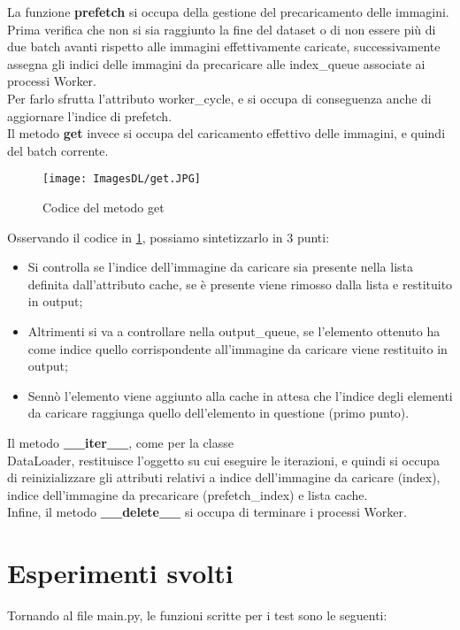 \documentclass[10pt,twocolumn,letterpaper]{article}
\newcommand{\bit} {\begin{itemize} }
\newcommand{\eit} {\end{itemize} }
\begin{document}
La funzione \textbf{prefetch} si occupa della gestione del precaricamento delle immagini. Prima verifica che non si sia raggiunto la fine del dataset o di non essere più di due batch avanti rispetto alle immagini effettivamente caricate, successivamente assegna gli indici delle immagini da precaricare alle index\_queue associate ai processi Worker.\\
Per farlo sfrutta l'attributo worker\_cycle, e si occupa di conseguenza anche di aggiornare l'indice di prefetch.\\
Il metodo \textbf{get} invece si occupa del caricamento effettivo delle immagini, e quindi del batch corrente.

\begin{figure}[h]
    \centering
    \texttt{[image: ImagesDL/get.JPG]}
    \caption{Codice del metodo get}
    \label{fig:get}
\end{figure}

Osservando il codice in \cref{fig:get}, possiamo sintetizzarlo in 3 punti:

\bit
    \item{Si controlla se l'indice dell'immagine da caricare sia presente nella lista definita dall'attributo cache, se è presente viene rimosso dalla lista e restituito in output;}
    \item{Altrimenti si va a controllare nella output\_queue, se l'elemento ottenuto ha come indice quello corrispondente all'immagine da caricare viene restituito in output;}
    \item{Sennò l'elemento viene aggiunto alla cache in attesa che l'indice degli elementi da caricare raggiunga quello dell'elemento in questione (primo punto).}
\eit

Il metodo \textbf{\_\_iter\_\_}, come per la classe \\DataLoader, restituisce l'oggetto su cui eseguire le iterazioni, e quindi si occupa di reinizializzare gli attributi relativi a indice dell'immagine da caricare (index), indice dell'immagine da precaricare (prefetch\_index) e lista cache.\\
Infine, il metodo \textbf{\_\_delete\_\_} si occupa di terminare i processi Worker.

\section{Esperimenti svolti}
\label{sec:exp}
Tornando al file main.py, le funzioni scritte per i test sono le seguenti:
\end{document}
